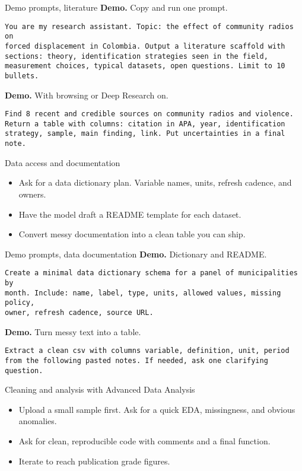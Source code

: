 \documentclass[aspectratio=169,professionalfonts]{beamer}
\newcommand{\demo}{\textbf{Demo. }}
\begin{document}
\begin{frame}[fragile]{Demo prompts, literature}
\demo Copy and run one prompt.
\begin{verbatim}
You are my research assistant. Topic: the effect of community radios on
forced displacement in Colombia. Output a literature scaffold with
sections: theory, identification strategies seen in the field,
measurement choices, typical datasets, open questions. Limit to 10 bullets.
\end{verbatim}

\demo With browsing or Deep Research on.
\begin{verbatim}
Find 8 recent and credible sources on community radios and violence.
Return a table with columns: citation in APA, year, identification
strategy, sample, main finding, link. Put uncertainties in a final note.
\end{verbatim}
\end{frame}

\begin{frame}{Data access and documentation}
  \begin{itemize}
    \item Ask for a data dictionary plan. Variable names, units, refresh cadence, and owners.
    \item Have the model draft a README template for each dataset.
    \item Convert messy documentation into a clean table you can ship.
  \end{itemize}
\end{frame}

\begin{frame}[fragile]{Demo prompts, data documentation}
\demo Dictionary and README.
\begin{verbatim}
Create a minimal data dictionary schema for a panel of municipalities by
month. Include: name, label, type, units, allowed values, missing policy,
owner, refresh cadence, source URL.
\end{verbatim}

\demo Turn messy text into a table.
\begin{verbatim}
Extract a clean csv with columns variable, definition, unit, period
from the following pasted notes. If needed, ask one clarifying question.
\end{verbatim}
\end{frame}

\begin{frame}{Cleaning and analysis with Advanced Data Analysis}
  \begin{itemize}
    \item Upload a small sample first. Ask for a quick EDA, missingness, and obvious anomalies.
    \item Ask for clean, reproducible code with comments and a final function.
    \item Iterate to reach publication grade figures.
  \end{itemize}
\end{frame}
\end{document}
